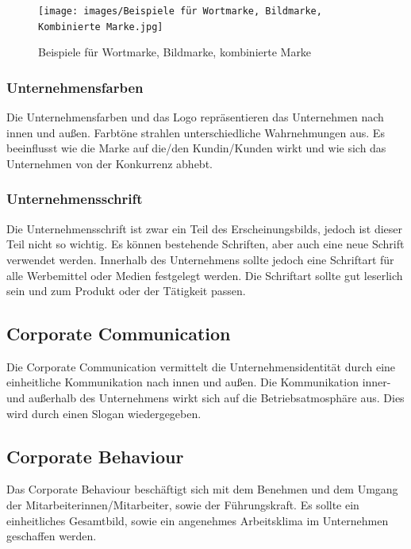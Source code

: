\begin{figure}[H]
	\centering
	\texttt{[image: images/Beispiele für Wortmarke, Bildmarke, Kombinierte Marke.jpg]}
	\caption[Beispiele für Wortmarke, Bildmarke, kombinierte Marke]{Beispiele für Wortmarke, Bildmarke, kombinierte Marke}
	\label{fig:Beispiele für Wortmarke, Bildmarke, kombinierte Marke}\parencite{Logodesign}
\end{figure}

\subsubsection{Unternehmensfarben}
Die Unternehmensfarben und das Logo repräsentieren das Unternehmen nach innen und außen. Farbtöne strahlen unterschiedliche Wahrnehmungen aus. Es beeinflusst wie die Marke auf die/den Kundin/Kunden wirkt und wie sich das Unternehmen von der Konkurrenz abhebt. \parencite{Unternehmensfarbe}

\subsubsection{Unternehmensschrift}
Die Unternehmensschrift ist zwar ein Teil des Erscheinungsbilds, jedoch ist dieser Teil nicht so wichtig. Es können bestehende Schriften, aber auch eine neue Schrift verwendet werden. Innerhalb des Unternehmens sollte jedoch eine Schriftart für alle Werbemittel oder Medien festgelegt werden. Die Schriftart sollte gut leserlich sein und zum Produkt oder der Tätigkeit passen. \parencite{Unternehmensschrift}

\subsection{Corporate Communication}
Die Corporate Communication vermittelt die Unternehmensidentität durch eine einheitliche Kommunikation nach innen und außen. Die Kommunikation inner- und außerhalb des Unternehmens wirkt sich auf die Betriebsatmosphäre aus. Dies wird durch einen Slogan wiedergegeben.

\subsection{Corporate Behaviour}
Das Corporate Behaviour beschäftigt sich mit dem Benehmen und dem Umgang der Mitarbeiterinnen/Mitarbeiter, sowie der Führungskraft. Es sollte ein einheitliches Gesamtbild, sowie ein angenehmes Arbeitsklima im Unternehmen geschaffen werden. 

